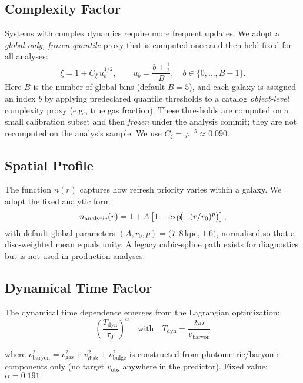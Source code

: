 \documentclass[usenatbib]{mnras}
\begin{document}
\subsection{Complexity Factor}

Systems with complex dynamics require more frequent updates. We adopt a \emph{global-only, frozen-quantile} proxy that is computed once and then held fixed for all analyses:
\begin{equation}
\xi = 1 + C_\xi\, u_b^{1/2}, \qquad u_b = \frac{b+\tfrac{1}{2}}{B},\quad b\in\{0,\dots,B{-}1\}.
\end{equation}
Here $B$ is the number of global bins (default $B{=}5$), and each galaxy is assigned an index $b$ by applying predeclared quantile thresholds to a catalog \emph{object-level} complexity proxy (e.g., true gas fraction). These thresholds are computed on a small calibration subset and then \emph{frozen} under the analysis commit; they are not recomputed on the analysis sample. We use $C_\xi = \varphi^{-5} \approx 0.090$.

\subsection{Spatial Profile}

The function $n(r)$ captures how refresh priority varies within a galaxy. We adopt the fixed analytic form
\begin{equation}
n_{\rm analytic}(r) = 1 + A\left[1 - \exp\!\bigl(-(r/r_0)^p\bigr)\right],
\end{equation}
with default global parameters $(A, r_0, p) = (7, 8$\,kpc, $1.6)$, normalised so that a disc-weighted mean equals unity. A legacy cubic-spline path exists for diagnostics but is not used in production analyses.

\subsection{Dynamical Time Factor}

The dynamical time dependence emerges from the Lagrangian optimization:
\begin{equation}
\left(\frac{T_{\text{dyn}}}{\tau_0}\right)^\alpha \quad \text{with} \quad T_{\text{dyn}} = \frac{2\pi r}{v_{\text{baryon}}}
\end{equation}

where $v_{\text{baryon}}^2 = v_{\text{gas}}^2 + v_{\text{disk}}^2 + v_{\text{bulge}}^2$ is constructed from photometric/baryonic components only (no target $v_{\text{obs}}$ anywhere in the predictor). Fixed value: $\alpha = 0.191$
\end{document}
